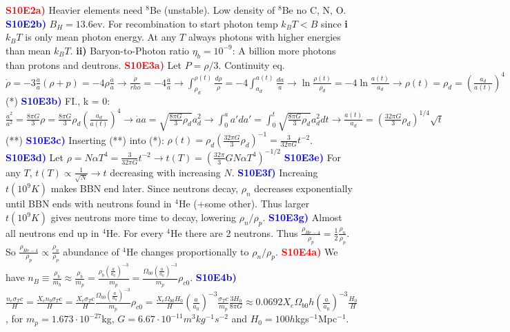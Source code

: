 \documentclass[landscape, a4paper,1pt,english]{article}
\begin{document}
{{{\begin{multicols}{5}
\textcolor{red}{\textbf{S10E2a)}} Heavier elements need $^8$Be (unstable). Low density of $^8$Be no C, N, O.   
\textcolor{blue}{\textbf{S10E2b)}} $B_H = 13.6$ev. For recombination to start photon temp $k_BT<B$ since \textbf{i} $k_BT$ is only mean photon energy. At any $T$ always photons with higher energies than mean $k_BT$. \textbf{ii)} Baryon-to-Photon ratio $\eta_b = 10^{-9}$: A billion more photons than protons and deutrons.
\textcolor{red}{\textbf{S10E3a)}} Let $P = \rho/3$. Continuity eq. $\dot{\rho} = -3\frac{\dot{a}}{a}(\rho + p) = -4\rho\frac{\dot{a}}{a} \rightarrow \frac{\dot{\rho}}{rho} = -4\frac{\dot{a}}{a}\rightarrow \int_{\rho_d}^{\rho(t)}\frac{d\rho}{\rho} = -4\int_{a_d}^{a(t)}\frac{da}{a} \rightarrow \ln\frac{\rho(t)}{\rho_d} = -4\ln\frac{a(t)}{a_d}\rightarrow\rho(t) = \rho_d = \left(\frac{a_d}{a(t)}\right)^4$ (*)
\textcolor{blue}{\textbf{S10E3b)}} FI., k = 0: $\frac{\dot{a}^2}{a^2} = \frac{8\pi G}{3}\rho = \frac{8\pi G}{3}\rho_d\left(\frac{a_d}{a(t)}\right)^4\rightarrow\dot{a}a = \sqrt{\frac{8\pi G}{3}\rho_d}a_d^2\rightarrow\int_{0}^{a}a'da' = \int_{0}^{t}\sqrt{\frac{8\pi G}{3}\rho_d}a_d^2dt\rightarrow \frac{a(t)}{a_d} = \left(\frac{32\pi G}{3}\rho_d\right)^{1/4}\sqrt{t}$ (**)
\textcolor{blue}{\textbf{S10E3c)}} Inserting (**) into (*): $\rho(t) = \rho_d\left(\frac{32\pi G}{3}\rho_d\right)^{-1} = \frac{3}{32\pi G}t^{-2}$.
\textcolor{blue}{\textbf{S10E3d)}} Let $\rho = N\alpha T^4 = \frac{3}{32\pi G}t^{-2}\rightarrow t(T) = \left(\frac{32\pi}{3}GN\alpha T^4\right)^{-1/2}$
\textcolor{blue}{\textbf{S10E3e)}} For any $T$, $t(T)\propto\frac{1}{\sqrt{N}}\rightarrow t$ decreasing with increasing $N$.
\textcolor{blue}{\textbf{S10E3f)}} Increaing $t(10^9K)$ makes BBN end later. Since neutrons decay, $\rho_n$ decreases exponentially until BBN ends with neutrons found in $^4$He (+some other). Thus larger $t(10^9K)$ gives neutrons more time to decay, lowering $\rho_n/\rho_p$.
\textcolor{blue}{\textbf{S10E3g)}} Almost all neutrons end up in $^4$He. For every $^4$He there are 2 neutrons. Thus $\frac{\rho_{He-4}}{\rho_p} = \frac{1}{2}\frac{\rho_n}{\rho_p}$. So  $\frac{\rho_{He-4}}{\rho_p} \propto\frac{\rho_n}{\rho_p}$ abundance of $^4$He changes proportionally to $\rho_n/\rho_p$.
\textcolor{red}{\textbf{S10E4a)}} We have $n_B\equiv\frac{\rho_b}{m_b}\approx\frac{\rho_b}{m_p} = \frac{\rho_b(\frac{a}{a_0})^{-3}}{m_p} = \frac{\Omega_{b0}(\frac{a}{a_0})^{-3}}{m_p}\rho_{c0}$.
\textcolor{blue}{\textbf{S10E4b)}} $\frac{n_e\sigma_T c}{H} = \frac{X_en_b\sigma_Tc}{H} = \frac{X_e\sigma_Tc}{H}\frac{\Omega_{b0}(\frac{a}{a_0})^{-3}}{m_p}\rho_{c0} = \frac{X_e\Omega_{b0}H_0}{H}\left(\frac{a}{a_0}\right)^{-3}\frac{\sigma_Tc}{m_p}\frac{3H_0}{8\pi G}\approx 0.0692 X_e\Omega_{b0}h(\frac{a}{a_0})^{-3}\frac{H_0}{H}$, for $m_p = 1.673\cdot 10^{-27}$kg, $G = 6.67\cdot10^{-11}m^3kg^{-1}s^{-2}$ and $H_0 = 100h$kgs$^{-1}$Mpc$^{-1}$.

\end{multicols}}}}
\end{document}
